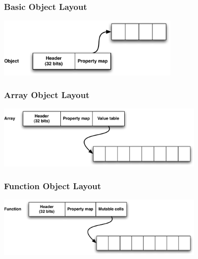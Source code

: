 \begin{frame}
\frametitle{\bf Basic Object Layout}

\begin{center}
\includegraphics[width=3.5in]{images/obj_layout_basic}
\end{center}
\end{frame}

\begin{frame}
\frametitle{\bf Array Object Layout}

\begin{center}
\includegraphics[width=4in]{images/obj_layout_array}
\end{center}
\end{frame}

\begin{frame}
\frametitle{\bf Function Object Layout}

\begin{center}
\includegraphics[width=4in]{images/obj_layout_func}
\end{center}
\end{frame}

